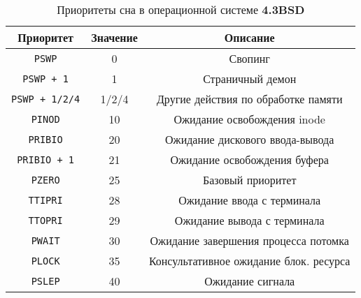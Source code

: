 \begin{table}[!h]
	\begin{center}
		\caption{Приоритеты сна в операционной системе \textbf{4.3BSD}}
		\label{tab:bsd}
		\begin{tabular}{ |c|c|c|  }
			\hline
			\textbf{Приоритет} & \textbf{Значение} & \textbf{Описание} \\
			\hline
			\texttt{PSWP} & 0 & Свопинг \\
			\hline
			\texttt{PSWP + 1} & 1 & Страничный демон \\
			\hline
			\texttt{PSWP + 1/2/4} & 1/2/4 & Другие действия по обработке памяти \\
			\hline
			\texttt{PINOD} & 10 & Ожидание освобождения inode \\
			\hline
			\texttt{PRIBIO} & 20 & Ожидание дискового ввода-вывода \\
			\hline
			\texttt{PRIBIO + 1} & 21 & Ожидание освобождения буфера \\
			\hline
			\texttt{PZERO} & 25 & Базовый приоритет \\
			\hline
			\texttt{TTIPRI} & 28 & Ожидание ввода с терминала \\
			\hline
			\texttt{TTOPRI} & 29 & Ожидание вывода с терминала \\
			\hline 
			\texttt{PWAIT} & 30 & Ожидание завершения процесса потомка \\
			\hline
			\texttt{PLOCK} & 35 & Консультативное ожидание блок. ресурса \\
			\hline
			\texttt{PSLEP} & 40 & Ожидание сигнала \\
			\hline
		\end{tabular}
	\end{center}
\end{table}

